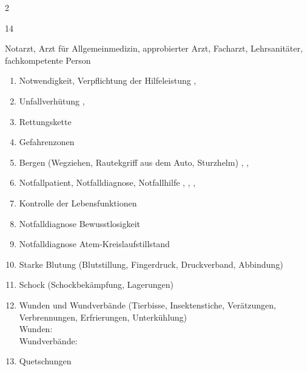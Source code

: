 \begin{WidePar}
\begin{multicols}{2}
  \begin{inparadesc}
    \item[Stundenanzahl:] 14
    \item[Lehrkraft:] Notarzt, Arzt für Allgemeinmedizin, approbierter Arzt,
    Facharzt, Lehrsanitäter, fachkompetente Person
  \end{inparadesc}
  \begin{enumerate}
    \item
    Notwendigkeit, Verpflichtung der Hilfeleistung \dotfill {},
    \item
    Unfallverhütung \dotfill {},
    \item
    Rettungskette \dotfill \noindent{}
    \item
    Gefahrenzonen \dotfill \noindent{}
    \item
    Bergen (Wegziehen, Rautekgriff aus dem  Auto, Sturzhelm) \dotfill  {},
    ,
    \item
    Notfallpatient, Notfalldiagnose, Notfallhilfe \dotfill {},
    ,
    ,
    \item    Kontrolle der Lebensfunktionen \dotfill \noindent{}
    \item    Notfalldiagnose Bewusstlosigkeit \dotfill  {}
    \item    Notfalldiagnose  Atem-Kreislaufstillstand \dotfill {}
    \item    Starke Blutung (Blutstillung, Fingerdruck,  Druckverband, Abbindung) \dotfill {}
    \item    Schock (Schockbekämpfung,  Lagerungen) \dotfill {}
    \item    Wunden und Wundverbände (Tierbisse, Insektenstiche, Verätzungen,
    Verbrennungen, Erfrierungen, Unterkühlung)
    \\
    Wunden:  \dotfill {} \\
    Wundverbände:  \dotfill {}
    \item    Quetschungen \dotfill {}

\end{enumerate}
\end{multicols}
\end{WidePar}
